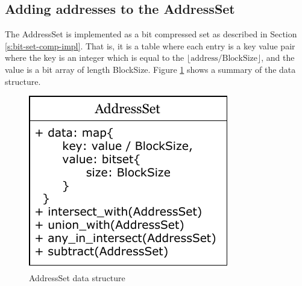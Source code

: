 \documentclass[12pt,twoside]{reedthesis}
\begin{document}
		\subsection{Adding addresses to the AddressSet}\label{s:access-set}
			
			
			
			
			The AddressSet is implemented as a bit compressed set as described in Section \ref{s:bit-set-comp-impl}. That is, it is a table where each entry is a key value pair where the key is an integer which is equal to the $\lfloor \text{address}/\text{BlockSize} \rfloor$, and the value is a bit array of length BlockSize. Figure \ref{fig:bitset} shows a summary of the data structure. 
			
			
			\begin{figure}[h]
				\caption{AddressSet data structure}
				\label{fig:bitset}
				\includegraphics[scale=1.0]{bit_data.pdf}
			\end{figure}
		
\end{document}
